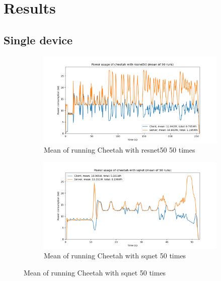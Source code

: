 \documentclass[../thesis.tex]{subfiles}
\begin{document}
\section{Results}
\subsection{Single device}
\begin{figure}[hbt!]
    \begin{subfigure}{.475\linewidth}
            \includegraphics[width=\textwidth]{Thesis/Images/Means/mean_cheetah-resnet50.png}
            \caption{Mean of running Cheetah with resnet50 50 times}
            \label{fig:mean_cheetah_resnet50}
    \end{subfigure}\hfill %
    \begin{subfigure}{.475\linewidth}
            \includegraphics[width=\textwidth]{Thesis/Images/Means/mean_cheetah-sqnet.png}
            \caption{Mean of running Cheetah with sqnet 50 times}
            \label{fig:mean_cheetah_sqnet}
    \end{subfigure}

    \medskip %
    

\end{figure}
\end{document}

